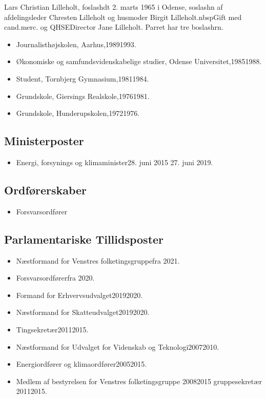 \documentclass[11pt, a4paper]{awesome-cv}
\begin{document}
\makecvheader[R]
\makelettertitle
\begin{cvletter}
Lars Christian Lilleholt, foslashdt 2. marts 1965 i Odense, soslashn af afdelingsleder Chresten Lilleholt og husmoder Birgit Lilleholt.nbspGift med cand.merc. og QHSEDirector Jane Lilleholt. Parret har tre boslashrn.

\begin{itemize}
\item Journalisthøjskolen, Aarhus,19891993.
\item Økonomiske og samfundsvidenskabelige studier, Odense Universitet,19851988.
\item Student, Tornbjerg Gymnasium,19811984.
\item Grundskole, Giersings Realskole,19761981.
\item Grundskole, Hunderupskolen,19721976.
\end{itemize}
\subsection*{Ministerposter}
\begin{itemize}
\item Energi, forsynings og klimaminister28. juni 2015  27. juni 2019.
\end{itemize}
\subsection*{Ordførerskaber}
\begin{itemize}
\item Forsvarsordfører
\end{itemize}
\subsection*{Parlamentariske Tillidsposter}
\begin{itemize}
\item Næstformand for Venstres folketingsgruppefra 2021.
\item Forsvarsordførerfra 2020.
\item Formand for Erhvervsudvalget20192020.
\item Næstformand for Skatteudvalget20192020.
\item Tingsekretær20112015.
\item Næstformand for Udvalget for Videnskab og Teknologi20072010.
\item Energiordfører og klimaordfører20052015.
\item Medlem af bestyrelsen for Venstres folketingsgruppe 20082015 gruppesekretær 20112015.
\end{itemize}

\end{cvletter}
\end{document}
